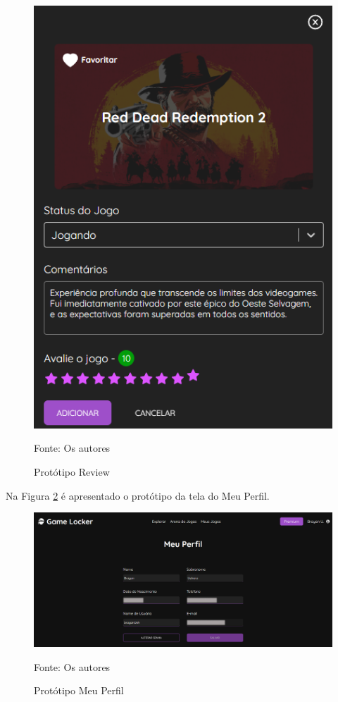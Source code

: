 \begin{apendicesenv}
\begin{figure}[H]
	\centering
	\includegraphics[scale=0.7]{./imagens/PrototipoReview.png}
	\caption{Protótipo Review}
	Fonte: Os autores
    \label{prototipoReview}
\end{figure}
\pagebreak

Na Figura \ref{prototipoMeuPerfil} é apresentado o protótipo da tela do Meu Perfil.

\begin{figure}[H]
	\centering
	\includegraphics[scale=0.34]{./imagens/PrototipoMeuPerfil.png}
	\caption{Protótipo Meu Perfil}
	Fonte: Os autores
    \label{prototipoMeuPerfil}
\end{figure}


\end{apendicesenv}

